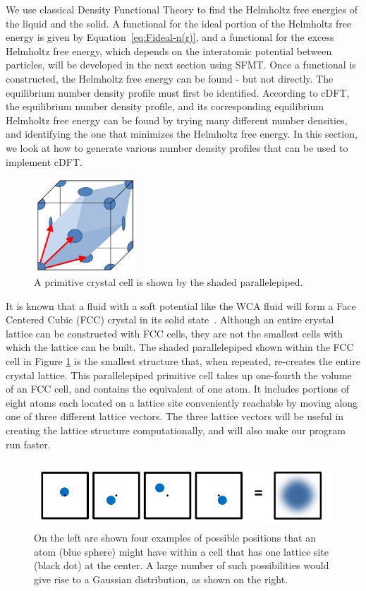 \documentclass[double,12pt]{beavtex}
\begin{document}
We use classical Density Functional Theory 
to find the Helmholtz free energies of the liquid and the solid. 
A functional for the ideal portion of the
Helmholtz free energy is given by Equation~\ref{eq:Fideal-n(r)}, and a 
functional for 
the excess Helmholtz free energy, which depends on the interatomic potential
between particles, will be developed in the next section using SFMT. 
Once a functional is constructed, the Helmholtz free energy can be found - 
but not directly. The equilibrium number density profile must first be 
identified. According to cDFT, the equilibrium number density profile, 
and its corresponding equilibrium Helmholtz free energy can be found 
by trying many different number densities, and identifying the one that 
minimizes the Helmholtz free energy. In this section, we look at how to 
generate various number density profiles that can be used to implement cDFT. 

\begin{figure}
  \centering
  \includegraphics[height=3.5cm]{PrimitiveCellLightBlue.png}
  \caption{A primitive crystal cell is shown by the shaded parallelepiped.}
  \label{fig:primitivecell}
\end{figure}

It is known that a fluid with a soft potential like the WCA fluid will 
form a Face Centered Cubic (FCC) crystal in its solid state~\cite{Hansen}. 
Although an entire 
crystal lattice can be constructed with FCC cells, 
they are not the smallest cells with which the lattice can be built. 
The shaded parallelepiped shown within the FCC cell in Figure \ref{fig:primitivecell} 
is the smallest structure that, when repeated, re-creates the entire crystal 
lattice. This parallelepiped primitive cell takes up one-fourth the volume 
of an FCC cell, and contains the equivalent of one atom.
It includes portions of eight atoms each located on a lattice site conveniently 
reachable by moving along one of three different lattice vectors. 
The three lattice vectors will be useful in 
creating the lattice structure computationally, and will also make our 
program run faster.

\begin{figure}
  \centering
  \includegraphics[height=2.5cm]{Ensemble_Gaussian.png}
  \caption{On the left are shown four examples of possible positions 
  that an atom (blue sphere) might have within a cell that has one 
  lattice site (black dot) at the center. A large number of such 
  possibilities would give rise to a Gaussian distribution, 
  as shown on the right.}
  \label{fig:Ensemble_Gaus}
\end{figure} 
\end{document}

